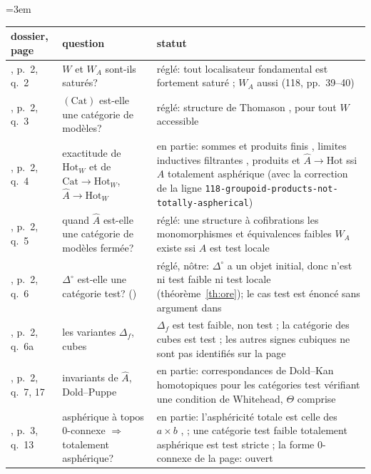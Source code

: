 \begin{center}\scriptsize\emergencystretch=3em
\begin{tabularx}{\linewidth}{>{\raggedright\arraybackslash}p{1.25cm}>{\raggedright\arraybackslash}X>{\raggedright\arraybackslash}p{5.2cm}}
\toprule
dossier, page & question & statut\\
\midrule
108, p.~2, q.~2 & $W$ et $W_A$ sont-ils saturés? & réglé: tout localisateur fondamental est fortement saturé \cite[prop.~4.2.4]{cisinski-308}; $W_A$ aussi (118, pp.~39--40)\\
108, p.~2, q.~3 & $(\mathrm{Cat})$ est-elle une catégorie de modèles? & réglé: structure de Thomason \cite[th.~5.2.12, 5.2.15]{cisinski-308}, pour tout $W$ accessible\\
108, p.~2, q.~4 & exactitude de $\mathrm{Hot}_W$ et de $\mathrm{Cat}\to\mathrm{Hot}_W$, $\widehat A\to\mathrm{Hot}_W$ & en partie: sommes et produits finis \cite[\S9]{maltsiniotis-2001}, limites inductives filtrantes \cite[cor.~4.2.22]{cisinski-308}, produits et $\widehat A\to\mathrm{Hot}$ ssi $A$ totalement asphérique \cite[prop.~4.3.2]{cisinski-308} (avec la correction de la ligne \nolinkurl{118-groupoid-products-not-totally-aspherical})\\
108, p.~2, q.~5 & quand $\widehat A$ est-elle une catégorie de modèles fermée? & réglé: une structure à cofibrations les monomorphismes et équivalences faibles $W_A$ existe ssi $A$ est test locale \cite[introduction, th.~1.4.3, cor.~4.2.18]{cisinski-308}\\
108, p.~2, q.~6 & $\Delta^{\circ}$ est-elle une catégorie test? (\q{non}) & réglé, nôtre: $\Delta^\circ$ a un objet initial, donc n'est ni test faible ni test locale (théorème~\ref{th:ore}); le cas test est énoncé sans argument dans \cite[\S88]{ps-arxiv}\\
108, p.~2, q.~6a & les variantes $\Delta_f$, cubes & $\Delta_f$ est test faible, non test \cite[\S8]{maltsiniotis-2001}; la catégorie des cubes est test \cite[cor.~8.4.13]{cisinski-308}; les autres signes cubiques ne sont pas identifiés sur la page\\
108, p.~2, q.~7, 17 & invariants de $\widehat A$, Dold--Puppe & en partie: correspondances de Dold--Kan homotopiques pour les catégories test vérifiant une condition de Whitehead, $\Theta$ comprise \cite{hubert-thesis,hubert-dk}\\
108, p.~3, q.~13 & asphérique à topos 0-connexe $\Rightarrow$ totalement asphérique? & en partie: l'asphéricité totale est celle des $a\times b$ \cite[4.3.1--4.3.2]{cisinski-308}, \cite[prop.~7.1]{maltsiniotis-2001}; une catégorie test faible totalement asphérique est test stricte \cite[prop.~1.17]{hubert-dk}; la forme 0-connexe de la page: ouvert\\

\end{tabularx}
\end{center}

